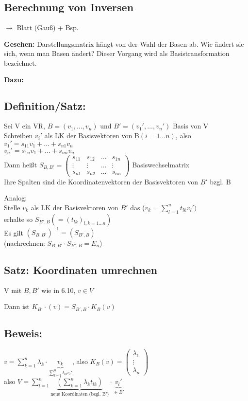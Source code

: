 \subsection{Berechnung von Inversen}
$\rightarrow$ Blatt (Gauß) + Bsp.

\textbf{Gesehen:} Darstellungsmatrix hängt von der Wahl der Basen ab. Wie ändert sie sich, wenn man Basen ändert? Dieser Vorgang wird als Basistransformation bezeichnet.

\textbf{Dazu:}
\subsection{Definition/Satz:}
Sei V ein VR, $B=(v_1,\dots,v_n)$ und $B'=(v_1',\dots,v_n')$ Basis von V\\
Schreiben $v_i'$ als LK der Basisvektoren von B$(i=1\dots n)$, also\\
$v_1'=s_{11}v_1+\dots+s_{n1}v_n$\\
$v_n'=s_{1n}v_1+\dots+s_{nn}v_n$\\
Dann heißt $S_{B,B'}=\begin{pmatrix}s_{11} & s_{12} & \dots & s_{1n} \\ \vdots & \vdots & \dots & \vdots \\ s_{n1} & s_{n2} & \dots & s_{nn}\end{pmatrix}$ Basiswechselmatrix\\
Ihre Spalten sind die Koordinatenvektoren der Basisvektoren von $B'$ bzgl. B

Analog:\\
Stelle $v_k$ als LK der Basisvektoren von $B'$ das ($v_k=\sum_{l=1}^n t_{lk}v_l')$\\
erhalte so $S_{B',B} (=(t_{lk})_{l,k=1\dots n})$\\
Es gilt $(S_{B,B'})^{-1}=(S_{B',B})$\\
(nachrechnen: $S_{B,B'}\cdot S_{B',B}=E_n$)

\subsection{Satz: Koordinaten umrechnen}
V mit $B,B'$ wie in 6.10, $v\in V$

Dann ist $K_{B'}\cdot (v)=S_{B',B}\cdot K_B(v)$

\subsection*{Beweis:} $v=\sum_{k=1}^n \lambda_k\cdot \underbrace{v_k}_{\sum_{l=1}^n t_{lk}v_l'}$, also $K_B(v)=\begin{pmatrix}\lambda_1 \\ \vdots \\ \lambda_n\end{pmatrix}$\\
also $V=\sum_{l=1}^n\underbrace{\left(\sum_{k=1}^n \lambda_k t_{lk}\right)}_{\text{neue Koordinaten (bzgl. B')}}\cdot \underbrace{v_l'}_{\in B'}$

